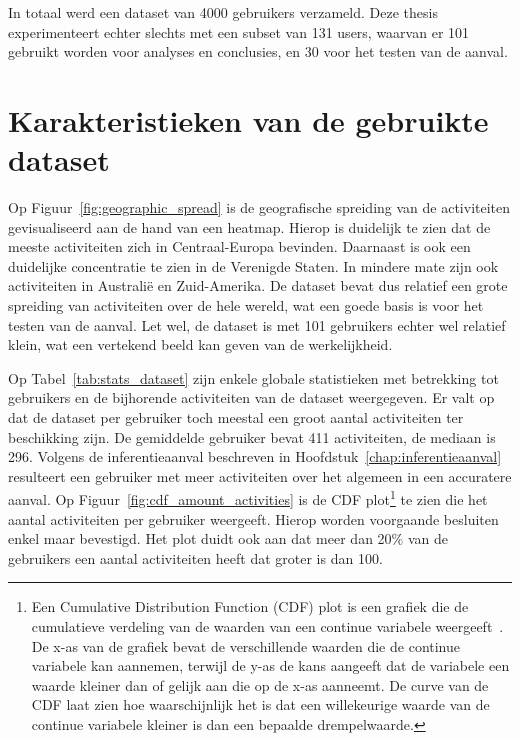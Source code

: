 In totaal werd een dataset van 4000 gebruikers verzameld. Deze thesis
experimenteert echter slechts met een subset van 131 users, waarvan er 101
gebruikt worden voor analyses en conclusies, en 30 voor het testen van de
aanval.

\section{Karakteristieken van de gebruikte dataset}
Op Figuur~\ref{fig:geographic_spread} is de geografische spreiding van de
activiteiten gevisualiseerd aan de hand van een heatmap. Hierop is duidelijk te
zien dat de meeste activiteiten zich in Centraal-Europa bevinden. Daarnaast is
ook een duidelijke concentratie te zien in de Verenigde Staten. In mindere mate
zijn ook activiteiten in Australië en Zuid-Amerika. De dataset bevat dus
relatief een grote spreiding van activiteiten over de hele wereld, wat een
goede basis is voor het testen van de aanval. Let wel, de dataset is met 101
gebruikers echter wel relatief klein, wat een vertekend beeld kan geven van de
werkelijkheid.

Op Tabel~\ref{tab:stats_dataset} zijn enkele globale statistieken met
betrekking tot gebruikers en de bijhorende activiteiten van de dataset
weergegeven. Er valt op dat de dataset per gebruiker toch meestal een groot
aantal activiteiten ter beschikking zijn. De gemiddelde gebruiker bevat 411
activiteiten, de mediaan is 296. Volgens de inferentieaanval beschreven in
Hoofdstuk~\ref{chap:inferentieaanval} resulteert een gebruiker met meer
activiteiten over het algemeen in een accuratere aanval. Op
Figuur~\ref{fig:cdf_amount_activities} is de \ac{CDF} plot\footnote{Een
    Cumulative Distribution Function (CDF) plot is een grafiek die de cumulatieve
    verdeling van de waarden van een continue variabele
    weergeeft~\cite{CursusSt38:online}. De x-as van de grafiek bevat de
    verschillende waarden die de continue variabele kan aannemen, terwijl de y-as
    de kans aangeeft dat de variabele een waarde kleiner dan of gelijk aan die op
    de x-as aanneemt. De curve van de CDF laat zien hoe waarschijnlijk het is dat
    een willekeurige waarde van de continue variabele kleiner is dan een bepaalde
    drempelwaarde.} te zien die het aantal activiteiten per gebruiker weergeeft.
Hierop worden voorgaande besluiten enkel maar bevestigd. Het plot duidt ook aan
dat meer dan 20\% van de gebruikers een aantal activiteiten heeft dat groter is
dan 100.

